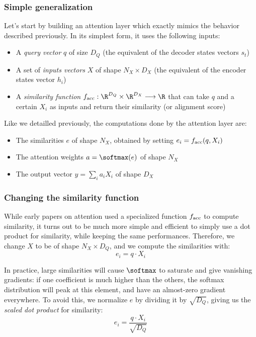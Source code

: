 \subsubsection{Simple generalization}
Let's start by building an attention layer which exactly mimics the behavior described previously. In its simplest form, it uses the following inputs:
\begin{itemize}
    \item A \emph{query vector} $q$ of size $D_Q$ (the equivalent of the decoder states vectors $s_t$)
    \item A set of \emph{inputs vectors} $X$ of shape $N_X\times D_X$ (the equivalent of the encoder states vector $h_i$)
    \item A \emph{similarity function} $f_{\textnormal{acc}}:\R^{D_Q}\times\R^{D_X} \longrightarrow \R$ that can take $q$ and a certain $X_i$ as inputs and return their similarity (or alignment score)
\end{itemize}
Like we detailled previously, the computations done by the attention layer are:
\begin{itemize}
    \item The similarities $e$ of shape $N_X$, obtained by setting $e_i = f_{\textnormal{acc}}(q, X_i)$
    \item The attention weights $a=\softmax(e)$ of shape $N_X$
    \item The output vector $y = \sum_i a_i X_i$ of shape $D_X$
\end{itemize}

\subsubsection{Changing the similarity function}
While early papers on attention used a specialized function $f_{\textnormal{acc}}$ to compute similarity, it turns out to be much more simple and efficient to simply use a dot product for similarity, while keeping the same performances. Therefore, we change $X$ to be of shape $N_X\times D_Q$, and we compute the similarities with:
\begin{equation*}
    e_i = q\cdot X_i
\end{equation*}

In practice, large similarities will cause $\softmax$ to saturate and give vanishing gradients: if one coefficient is much higher than the others, the softmax distribution will peak at this element, and have an almost-zero gradient everywhere. To avoid this, we normalize $e$ by dividing it by $\sqrt{D_Q}$, giving us the \emph{scaled dot product} for similarity:
\begin{equation*}
    e_i = \frac{q\cdot X_i}{\sqrt{D_Q}}
\end{equation*}

